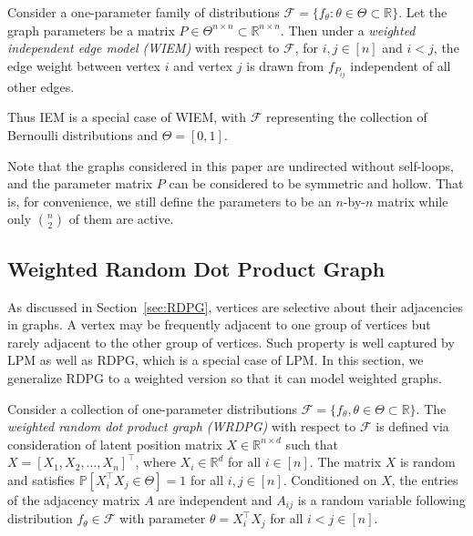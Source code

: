 \begin{definition} 
\label{def:WIEM}
Consider a one-parameter family of distributions $\mathcal{F} = \{ f_{\theta} : \theta \in \Theta \subset \mathbb{R} \}$. Let the graph parameters be a matrix $P \in \Theta^{n \times n} \subset \mathbb{R}^{n \times n}$.
Then under a {\em{weighted independent edge model} (WIEM)} with respect to $\mathcal{F}$, for $i, j \in [n]$ and $i < j$, the edge weight between vertex $i$ and vertex $j$ is drawn from $f_{P_{ij}}$ independent of all other edges.
\end{definition}

Thus IEM is a special case of WIEM, with $\mathcal{F}$ representing the collection of Bernoulli distributions and $\Theta = [0, 1]$.

Note that the graphs considered in this paper are undirected without self-loops, and the parameter matrix $P$ can be considered to be symmetric and hollow. That is, for convenience, we still define the parameters to be an $n$-by-$n$ matrix while only $n \choose 2$ of them are active.



\subsection{Weighted Random Dot Product Graph}
\label{sec:WRDPG}

As discussed in Section~\ref{sec:RDPG}, vertices are selective about their adjacencies in graphs. A vertex may be frequently adjacent to one group of vertices but rarely adjacent to the other group of vertices. Such property is well captured by LPM as well as RDPG, which is a special case of LPM. In this section, we generalize RDPG to a weighted version so that it can model weighted graphs. 

\begin{definition}
Consider a collection of one-parameter distributions $\mathcal{F} = \{ f_{\theta}, \theta \in \Theta \subset \mathbb{R} \}$. The {\em{weighted random dot product graph (WRDPG)}} with respect to $\mathcal{F}$ is defined via consideration of latent position matrix $X \in \mathbb{R}^{n \times d}$ such that $X = [X_1, X_2, \dotsc, X_n]^{\top}$, where $X_i \in \mathbb{R}^d$ for all $i \in [n]$. The matrix $X$ is random and satisfies $\mathbb{P}\left[ X_i^{\top} X_j \in \Theta \right] = 1$ for all $i, j \in [n]$. Conditioned on $X$, the entries of the adjacency matrix $A$ are independent and $A_{ij}$ is a random variable following distribution $f_{\theta} \in \mathcal{F}$ with parameter $\theta = X_i^{\top} X_j $ for all $i < j \in [n]$.
\end{definition}


